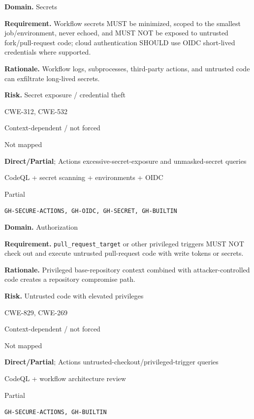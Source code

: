 \documentclass[10pt,letterpaper]{article}
\newcommand{\code}[1]{\texttt{\small #1}}
\newcommand{\prioritybadge}[2]{\tcbox[on line,boxrule=0pt,arc=1.2mm,boxsep=0.7mm,left=1mm,right=1mm,top=0.4mm,bottom=0.4mm,colback=#2!12,coltext=#2]{\scriptsize\bfseries #1}}
\begin{document}
\begin{rulebox}[title={\texttt{SCS-ACTIONS-SECRET-001} \hfill \prioritybadge{Critical Control}{Critical}}]
\textbf{Domain.} Secrets

\textbf{Requirement.} Workflow secrets MUST be minimized, scoped to the smallest job/environment, never echoed, and MUST NOT be exposed to untrusted fork/pull-request code; cloud authentication SHOULD use OIDC short-lived credentials where supported.

\textbf{Rationale.} Workflow logs, subprocesses, third-party actions, and untrusted code can exfiltrate long-lived secrets.

\textbf{Risk.} Secret exposure / credential theft

\begin{description}[leftmargin=2.65cm,labelwidth=2.3cm,style=nextline,itemsep=1pt,topsep=3pt]
  \item[CWE] CWE-312, CWE-532
  \item[OWASP] Context-dependent / not forced
  \item[CERT] Not mapped
  \item[CodeQL] \textbf{Direct/Partial}; Actions excessive-secret-exposure and unmasked-secret queries
  \item[Enforcement] CodeQL + secret scanning + environments + OIDC
  \item[Automation] Partial
  \item[Sources] \texttt{GH-SECURE-ACTIONS, GH-OIDC, GH-SECRET, GH-BUILTIN}
\end{description}
\end{rulebox}

\begin{rulebox}[title={\texttt{SCS-ACTIONS-AUTHZ-002} \hfill \prioritybadge{Critical Control}{Critical}}]
\textbf{Domain.} Authorization

\textbf{Requirement.} \code{pull\_request\_target} or other privileged triggers MUST NOT check out and execute untrusted pull-request code with write tokens or secrets.

\textbf{Rationale.} Privileged base-repository context combined with attacker-controlled code creates a repository compromise path.

\textbf{Risk.} Untrusted code with elevated privileges

\begin{description}[leftmargin=2.65cm,labelwidth=2.3cm,style=nextline,itemsep=1pt,topsep=3pt]
  \item[CWE] CWE-829, CWE-269
  \item[OWASP] Context-dependent / not forced
  \item[CERT] Not mapped
  \item[CodeQL] \textbf{Direct/Partial}; Actions untrusted-checkout/privileged-trigger queries
  \item[Enforcement] CodeQL + workflow architecture review
  \item[Automation] Partial
  \item[Sources] \texttt{GH-SECURE-ACTIONS, GH-BUILTIN}
\end{description}
\end{rulebox}
\end{document}
